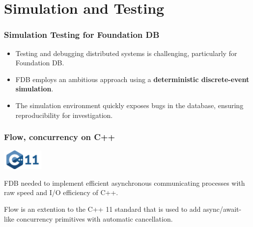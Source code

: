 \section{Simulation and Testing }

\begin{frame}
    \frametitle{Simulation Testing for Foundation DB}
    \begin{itemize}
        \item Testing and debugging distributed systems is challenging, particularly for Foundation DB.
        \item FDB employs an ambitious approach using a \textbf{deterministic discrete-event simulation}.
        \item The simulation environment quickly exposes bugs in the database, ensuring reproducibility for investigation.
    \end{itemize}
\end{frame}

\begin{frame}
    \frametitle{Flow, concurrency on C++}
    \includegraphics[width=2cm]{img/3-Testing/cpp.png}

    \vspace{0.5cm}
   FDB needed to implement efficient asynchronous communicating processes with raw speed and I/O efficiency of C++.
\vspace{0.5cm}

Flow is an extention to the C++ 11 standard that is used to add async/await-like
concurrency primitives with automatic cancellation.

   
\end{frame}

